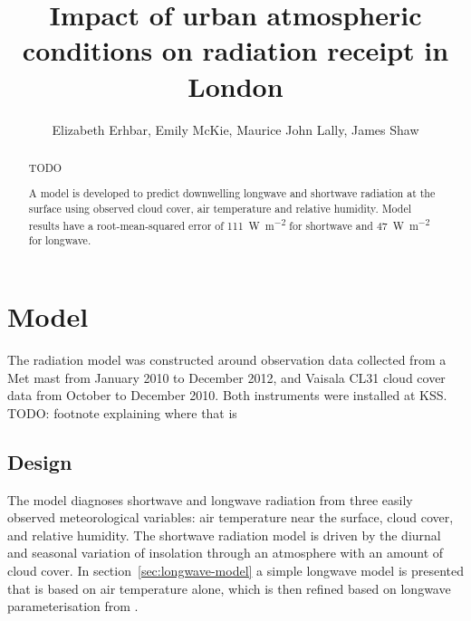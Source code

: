 \documentclass[a4paper,titlepage, twoside]{report}
\begin{document}
\expandafter\def\csname PY@tok@err\endcsname{}

\title{Impact of urban atmospheric conditions on radiation receipt in London}
\author{Elizabeth Erhbar, Emily McKie, Maurice John Lally, James Shaw}
\maketitle

\begin{abstract}
TODO

A model is developed to predict downwelling longwave and shortwave radiation at the surface using observed cloud cover, air temperature and relative humidity.  Model results have a root-mean-squared error of \SI{111}{\watt\per\meter\squared} for shortwave and \SI{47}{\watt\per\meter\squared} for longwave.
\end{abstract}

\tableofcontents

\chapter{Model}
The radiation model was constructed around observation data collected from a Met mast from January 2010 to December 2012, and Vaisala CL31 cloud cover data from October to December 2010.  Both instruments were installed at KSS. TODO: footnote explaining where that is

\section{Design}
The model diagnoses shortwave and longwave radiation from three easily observed meteorological variables: air temperature near the surface, cloud cover, and relative humidity.  The shortwave radiation model is driven by the diurnal and seasonal variation of insolation through an atmosphere with an amount of cloud cover.  In section~\ref{sec:longwave-model} a simple longwave model is presented that is based on air temperature alone, which is then refined based on longwave parameterisation from \cite{loridan}.
\end{document}
